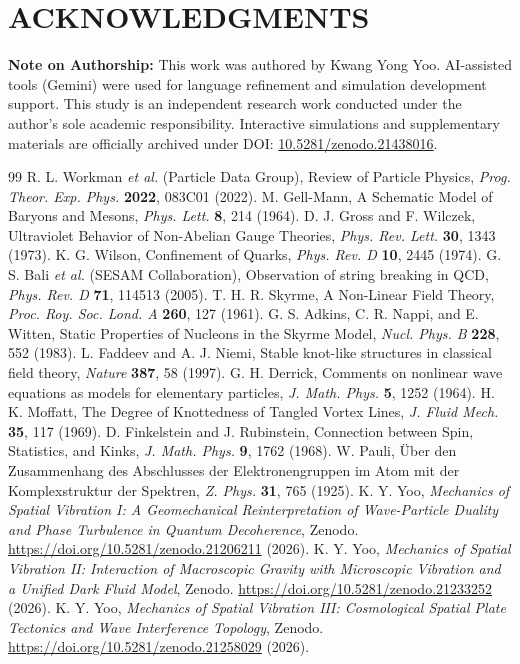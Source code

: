 \documentclass[reprint,amsmath,amssymb,aps,prd]{revtex4-2}
\begin{document}
\vspace{1em}
\section*{ACKNOWLEDGMENTS}
\textbf{Note on Authorship:} This work was authored by Kwang Yong Yoo. AI-assisted tools (Gemini) were used for language refinement and simulation development support. This study is an independent research work conducted under the author's sole academic responsibility. Interactive simulations and supplementary materials are officially archived under DOI: \href{https://doi.org/10.5281/zenodo.21438016}{10.5281/zenodo.21438016}.

\begin{thebibliography}{99}
 R. L. Workman \textit{et al.} (Particle Data Group), Review of Particle Physics, \textit{Prog. Theor. Exp. Phys.} \textbf{2022}, 083C01 (2022).
 M. Gell-Mann, A Schematic Model of Baryons and Mesons, \textit{Phys. Lett.} \textbf{8}, 214 (1964).
 D. J. Gross and F. Wilczek, Ultraviolet Behavior of Non-Abelian Gauge Theories, \textit{Phys. Rev. Lett.} \textbf{30}, 1343 (1973).
 K. G. Wilson, Confinement of Quarks, \textit{Phys. Rev. D} \textbf{10}, 2445 (1974).
 G. S. Bali \textit{et al.} (SESAM Collaboration), Observation of string breaking in QCD, \textit{Phys. Rev. D} \textbf{71}, 114513 (2005).
 T. H. R. Skyrme, A Non-Linear Field Theory, \textit{Proc. Roy. Soc. Lond. A} \textbf{260}, 127 (1961).
 G. S. Adkins, C. R. Nappi, and E. Witten, Static Properties of Nucleons in the Skyrme Model, \textit{Nucl. Phys. B} \textbf{228}, 552 (1983).
 L. Faddeev and A. J. Niemi, Stable knot-like structures in classical field theory, \textit{Nature} \textbf{387}, 58 (1997).
 G. H. Derrick, Comments on nonlinear wave equations as models for elementary particles, \textit{J. Math. Phys.} \textbf{5}, 1252 (1964).
 H. K. Moffatt, The Degree of Knottedness of Tangled Vortex Lines, \textit{J. Fluid Mech.} \textbf{35}, 117 (1969).
 D. Finkelstein and J. Rubinstein, Connection between Spin, Statistics, and Kinks, \textit{J. Math. Phys.} \textbf{9}, 1762 (1968).
 W. Pauli, \"{U}ber den Zusammenhang des Abschlusses der Elektronengruppen im Atom mit der Komplexstruktur der Spektren, \textit{Z. Phys.} \textbf{31}, 765 (1925).
 K. Y. Yoo, \textit{Mechanics of Spatial Vibration I: A Geomechanical Reinterpretation of Wave-Particle Duality and Phase Turbulence in Quantum Decoherence}, Zenodo. \url{https://doi.org/10.5281/zenodo.21206211} (2026).
 K. Y. Yoo, \textit{Mechanics of Spatial Vibration II: Interaction of Macroscopic Gravity with Microscopic Vibration and a Unified Dark Fluid Model}, Zenodo. \url{https://doi.org/10.5281/zenodo.21233252} (2026).
 K. Y. Yoo, \textit{Mechanics of Spatial Vibration III: Cosmological Spatial Plate Tectonics and Wave Interference Topology}, Zenodo. \url{https://doi.org/10.5281/zenodo.21258029} (2026).
\end{thebibliography}
\end{document}
